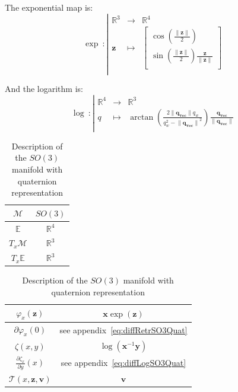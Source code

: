 The exponential map is:
\begin{equation}
  \exp\ :\left|
  \begin{array}{ccc}
    \mathbb{R}^3 & \rightarrow & \mathbb{R}^4 \\
    \mathbf{z} & \mapsto & \begin{bmatrix}
      \cos \left( \frac{\|\mathbf{z}\|}{2} \right)\\
      \sin \left( \frac{\|\mathbf{z}\|}{2} \right) \frac{\mathbf{z}}{\|\mathbf{z}\|}\\
    \end{bmatrix} \\
  \end{array} \nonumber
  \right.
\end{equation}

And the logarithm is:
\begin{equation}
  \log\ :\left|
  \begin{array}{ccc}
    \mathbb{R}^4 & \rightarrow & \mathbb{R}^3 \\
    q & \mapsto & \arctan \left( \frac{2 \|\mathbf{q_{vec}}\| q_w}{q_w^2 - {\|\mathbf{q_{vec}\|}^2}} \right) \frac{\mathbf{q_{vec} } }{\|\mathbf{q_{vec}}\|} \\
  \end{array}
  \right.
\end{equation}


\begin{table} [H]
\caption{Description of the $SO(3)$ manifold with quaternion representation}
\centering
\begin{tabular}{cc}
  \toprule
  $\mathcal{M}$ & $SO(3)$ \\
  \midrule
  $\mathbb{E}$ & $\mathbb{R}^{4}$ \\
  \midrule
  $T_x\mathcal{M}$ & $\mathbb{R}^3$ \\
  \midrule
  $T_x\mathbb{E}$ & $\mathbb{R}^3$ \\
  \bottomrule
\end{tabular}
\quad
\begin{tabular}{cc}
  \toprule
  $\varphi_x(\mathbf{z})$ & $\mathbf{x}\exp(\mathbf{z})$ \\
  \midrule
  $\partial \varphi_x(0)$ & see appendix~\ref{eq:diffRetrSO3Quat} \\
  \midrule
  $\zeta(x,y)$ & $\log(\mathbf{x}^{-1}\mathbf{y})$ \\
  \midrule
  $\frac{\partial \zeta_x}{\partial y}(x)$ & see appendix~\ref{eq:diffLogSO3Quat} \\
  \midrule
  $\mathcal{T}(x,\mathbf{z}, \mathbf{v})$ & $\mathbf{v}$ \\
  \bottomrule
\end{tabular}
\end{table}

